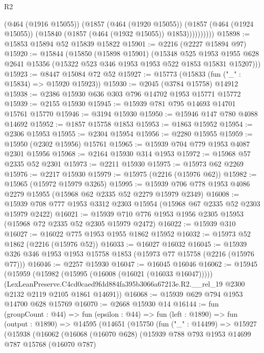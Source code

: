 \begin{lexlean}{R2}
\begin{coremodule}
                (@464 (@1916 @15055))
                (@1857
                  (@464 (@1920 @15055))
                  (@1857 (@464 (@1924 @15055)) (@15840 (@1857 (@464 (@1932 @15055)) @1853))))))))))
@15898 := @15853 @15894 @52 @15839 @15822
@15901 := @2216 (@2227 @15894 @97)
@15920 := @15844
    (@15850
      (@15898 @15901)
      (@15348
        @525
        @1953
        @1955
        @628
        @2641
        @15356
        (@15322 @523 @346 @1953 @1953 @522 @1853 @15831 @15207)))
@15923 := @8447 @15084 @72 @52
@15927 := @15773 (@15833 (fun ("_" : @15834) => @15920 @15923))
@15930 := @2045 (@3784 @15758) @14912
@15938 := @2386 @15930 @636 @303 @796 @14702 @1953 @15771 @15772
@15939 := @2155 @15930
@15945 := @15939 @781 @795 @14693 @14701 @15761 @15770
@15946 := @3194 @15930
@15950 := @15946 @147 @780 @4088 @14692
@15952 := @1857 @15758 @1853
@15953 := @1863 @15952
@15954 := @2306 @15953
@15955 := @2304 @15954
@15956 := @2280 @15955
@15959 := @15950 (@2302 @15956) @15761
@15965 := @15939 @704 @779 @1953 @4087 @2301 @15956
@15968 := @2164 @15930 @314 @1953
@15972 := @15968 @57 @2335 @52 @2301
@15973 := @2211 @15930
@15975 := @15973 @62 @2269
@15976 := @2217 @15930
@15979 := @15975 (@2216 (@15976 @62))
@15982 := @15965 (@15972 @15979 @3265)
@15995 := @15939 @706 @778 @1953 @4086 @2279 @15955 (@15968 @62 @2335 @52 @2279 @15979 @2349)
@16008 := @15939 @708 @777 @1953 @3312 @2303 @15954 (@15968 @67 @2335 @52 @2303 @15979 @2422)
@16021 := @15939 @710 @776 @1953 @1956 @2305 @15953 (@15968 @72 @2335 @52 @2305 @15979 @2472)
@16022 := @15939 @310
@16027 := @16022 @775 @1953 @1955 @1862 @15952
@16032 := @15973 @52 @1862 (@2216 (@15976 @52))
@16033 := @16027 @16032
@16045 := @15939 @326 @346 @1953 @1953 @15758 @1853 (@15973 @77 @15758 (@2216 (@15976 @77)))
@16046 := @2257 @15930
@16047 := @16045 @16046
@16062 := @15945
    (@15959
      (@15982 (@15995 (@16008 (@16021 (@16033 @16047)))))
      (LexLeanPreserve.C4cd0caed9fdd884fa395b3066a67213e.R2.__rel_19
        @2300
        @2132
        @2119
        @2105
        @1861
        @14691))
@16068 := @15939 @629 @794 @1953 @14700 @628 @15769
@16070 := @2668 @15930 @14
@16144 := fun (groupCount : @44) =>
  fun (epsilon : @44) =>
  fun (left : @1890) =>
  fun (output : @1890) =>
  @14595
    (@14651
      (@15750
        (fun ("_" : @14499) =>
        @15927
          (@15938
            (@16062
              (@16068
                (@16070 @628)
                (@15939
                  @788
                  @793
                  @1953
                  @14699
                  @787
                  @15768
                  (@16070 @787)

\end{coremodule}
\end{lexlean}
